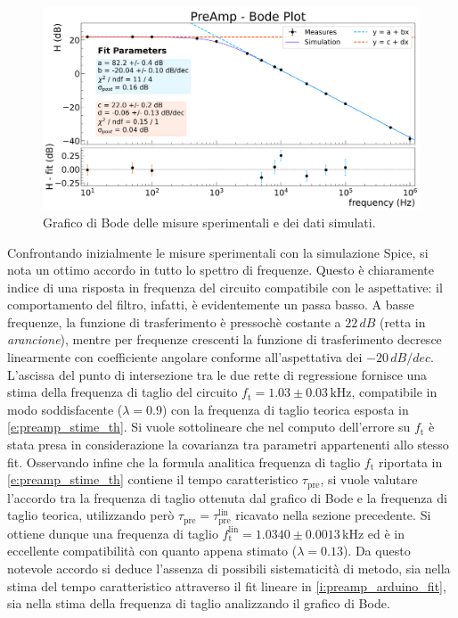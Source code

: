 \documentclass[a4paper,11pt]{article} %
\begin{document}
\begin{figure}%
	\centering
	\includegraphics[width=0.8\linewidth]{../Plots/PreAmp/bode_plot2.png}
	\vspace{-10pt}
	\caption{\small Grafico di Bode delle misure sperimentali e dei dati simulati.}
	\label{i:preamp_thebode}
\end{figure}

Confrontando inizialmente le misure sperimentali con la simulazione Spice, si nota un ottimo accordo in tutto lo spettro
di frequenze. Questo è chiaramente indice di una risposta in frequenza del circuito compatibile con le aspettative: il
comportamento del filtro, infatti, è evidentemente un passa basso. A basse frequenze, la funzione di trasferimento è
pressochè costante a $22\,\si{dB}$ (retta in \textit{arancione}), mentre per frequenze crescenti la funzione di
trasferimento decresce linearmente con coefficiente angolare conforme all'aspettativa dei $-20\,\si{dB/dec}$. L'ascissa
del punto di intersezione tra le due rette di regressione fornisce una stima della frequenza di taglio del circuito
$f_{\text{t}} = 1.03 \pm 0.03 \,\si{\kHz}$, compatibile in modo soddisfacente ($\lambda = 0.9$) con la frequenza di
taglio teorica esposta in \autoref{e:preamp_stime_th}. Si vuole sottolineare che nel computo dell'errore su
$f_{\text{t}}$ è stata presa in considerazione la covarianza tra parametri appartenenti allo stesso fit. Osservando
infine che la formula analitica frequenza di taglio $f_{\text{t}}$ riportata in \autoref{e:preamp_stime_th} contiene il
tempo caratteristico $\tau_{\text{pre}}$, si vuole valutare l'accordo tra la frequenza di taglio ottenuta dal grafico di
Bode e la frequenza di taglio teorica, utilizzando però $\tau_{\text{pre}}=\tau_{\text{pre}}^{\text{lin}}$ ricavato
nella sezione precedente. Si ottiene dunque una frequenza di taglio $f_{\text{t}}^{\text{lin}} = 1.0340 \pm 0.0013
\,\si{\kHz}$ ed è in eccellente compatibilità con quanto appena stimato ($\lambda = 0.13$). Da questo notevole accordo
si deduce l'assenza di possibili sistematicità di metodo, sia nella stima del tempo caratteristico attraverso il fit
lineare in \autoref{i:preamp_arduino_fit}, sia nella stima della frequenza di taglio analizzando il grafico di Bode. 
\end{document}
